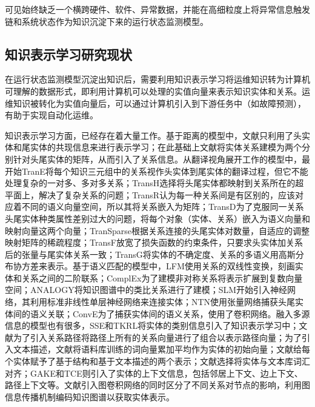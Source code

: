 可见始终缺乏一个横跨硬件、软件、异常数据，并能在高细粒度上将异常信息触发链和系统状态作为知识沉淀下来的运行状态监测模型。

\subsection{知识表示学习研究现状}
在运行状态监测模型沉淀出知识后，需要利用知识表示学习将运维知识转为计算机可理解的数据形式，即利用计算机可以处理的实值向量来表示知识实体和关系。运维知识被转化为实值向量后，可以通过计算机引入到下游任务中（如故障预测），有助于实现自动化运维。

知识表示学习方面，已经存在着大量工作。基于距离的模型中，文献\parencite{bordes2012joint}只利用了头实体和尾实体的共现信息来进行表示学习；在此基础上文献\parencite{bordes2011learning}将实体关系建模为两个分别针对头尾实体的矩阵，从而引入了关系信息。从翻译视角展开工作的模型中，最开始TranE\cite{bordes2013translatingE}将每个知识三元组中的关系视作头实体到尾实体的翻译过程，但它不能处理复杂的一对多、多对多关系；TransH\cite{wang2014knowledge}选择将头尾实体都映射到关系所在的超平面上，解决了复杂关系的问题；TransR\cite{lin2015learning}认为每一种关系间是有区别的，应该对应着不同的语义向量空间，所以其将关系嵌入为矩阵；TransD\cite{ji2015knowledge}为了克服同一关系头尾实体种类属性差别过大的问题，将每个对象（实体、关系）嵌入为语义向量和映射向量这两个向量；TranSparse\cite{ji2016knowledge}根据关系连接的头尾实体对数量，自适应的调整映射矩阵的稀疏程度；TransF\cite{feng2016knowledge}放宽了损失函数的约束条件，只要求头实体加关系后的张量与尾实体关系一致；TransG\cite{ou2016asymmetric}将实体的不确定度、关系的多语义用高斯分布协方差来表示。基于语义匹配的模型中，LFM\cite{jenatton2012latent}使用关系的双线性变换，刻画实体和关系之间的二阶联系；ComplEx\cite{trouillon2016complex}为了建模非对称关系将表示扩展到复数向量空间；ANALOGY\cite{liu2017analogical}将知识图谱中的类比关系进行了建模；SLM\cite{socher2013reasoning}开始引入神经网络，其利用标准非线性单层神经网络来连接实体；NTN\cite{socher2013reasoning}使用张量网络捕获头尾实体间的语义关联；ConvE\cite{dettmers2018convolutional}为了捕获实体间的语义关系，使用了卷积网络。融入多源信息的模型也有很多，SSE\cite{guo2015semantically}和TKRL\cite{xie2016representation}将实体的类别信息引入了知识表示学习中；文献\parencite{lin2015modeling}为了引入关系路径将路径上所有的关系向量进行了组合以表示路径向量；为了引入文本描述，文献\parencite{socher2013reasoning}将语料库训练的词向量累加平均作为实体的初始向量；文献\parencite{xie2016representation}给每个实体赋予了基于结构和基于文本描述的两个表示；文献\parencite{wang2016text}选择将实体与文本库词汇对齐；GAKE\cite{feng2016gake}和TCE\cite{shi2017knowledge}则引入了实体的上下文信息，包括邻居上下文、边上下文、路径上下文等。文献\parencite{schlichtkrull2018modeling}引入图卷积网络的同时区分了不同关系对节点的影响，利用图信息传播机制编码知识图谱以获取实体表示。

